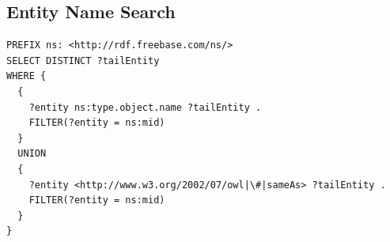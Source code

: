 \documentclass{article}
\begin{document}
\subsection{Entity Name Search}
\begin{lstlisting}[language=SPARQL,style=mystyle, escapechar=|]
PREFIX ns: <http://rdf.freebase.com/ns/>
SELECT DISTINCT ?tailEntity
WHERE {
  {
    ?entity ns:type.object.name ?tailEntity .
    FILTER(?entity = ns:mid)
  }
  UNION
  {
    ?entity <http://www.w3.org/2002/07/owl|\#|sameAs> ?tailEntity .
    FILTER(?entity = ns:mid)
  }
}
\end{lstlisting}



\end{document}
